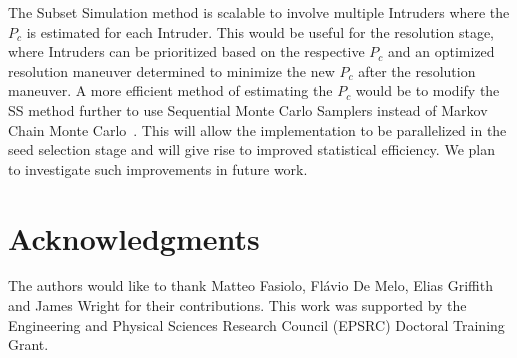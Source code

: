 \documentclass[journal]{IEEEtran}
\begin{document}
The Subset Simulation method is scalable to involve multiple Intruders where the $P_{c}$ is estimated for each Intruder. This would be useful for the resolution stage, where Intruders can be prioritized based on the respective $P_{c}$ and an optimized resolution maneuver determined to minimize the new $P_{c}$ after the resolution maneuver. A more efficient method of estimating the $P_{c}$ would be to modify the SS method further to use Sequential Monte Carlo Samplers instead of Markov Chain Monte Carlo~\cite{del2006sequential}. This will allow the implementation to be parallelized in the seed selection stage and will give rise to improved statistical efficiency. We plan to investigate such improvements in future work.


\section*{Acknowledgments}
The authors would like to thank Matteo Fasiolo, Fl\'avio De Melo, Elias Griffith and James Wright for their contributions. This work was supported by the Engineering and Physical Sciences Research Council (EPSRC) Doctoral Training Grant.

{}

\end{document}
